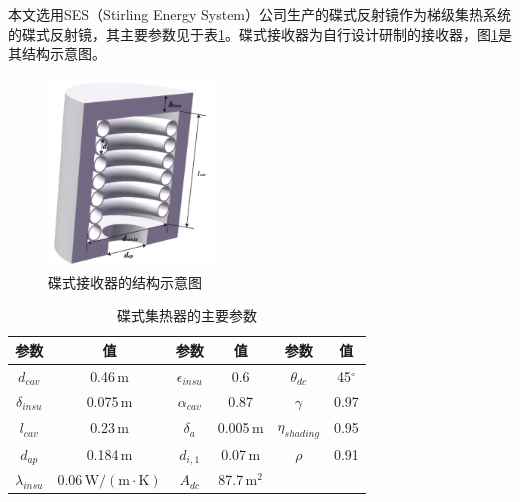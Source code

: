 本文选用SES（Stirling Energy System）公司生产的碟式反射镜作为梯级集热系统的碟式反射镜，其主要参数见于表\ref{tab:dc}。碟式接收器为自行设计研制的接收器，图\ref{fig:dishReceiver}是其结构示意图。

\begin{figure}[!ht]
\centering
\includegraphics[width=0.4\textwidth]{fig/DishReceiver.pdf}
\caption{碟式接收器的结构示意图}\label{fig:dishReceiver}
\end{figure}

\begin{table}[htbp]
	\setlength{\abovecaptionskip}{-10pt}
	\caption{碟式集热器的主要参数}
	\begin{center}
	\begin{tabular}{cccccc}
		\toprule
		参数		&	值	&	参数		&	值	&	参数		&	值\\
		\midrule
		$d_{cav}$	&	0.46$\,\mathrm{m}$	&	$\epsilon_{insu}$	&	0.6	&	$\theta_{dc}$	&	45$^\circ$\\
		$\delta_{insu}$	&	0.075$\,\mathrm{m}$	&	$\alpha_{cav}$	&	0.87	&	$\gamma$	&	0.97\\
		$l_{cav}$	&	0.23$\,\mathrm{m}$	&	$\delta_a$		&	0.005$\,\mathrm{m}$	&	$\eta_{shading}$	&	0.95\\
		$d_{ap}$	&	0.184$\,\mathrm{m}$	&	$d_{i,1}$	&	0.07$\,\mathrm{m}$	&	$\rho$	&	0.91\\
		$\lambda_{insu}$	&	0.06$\,\mathrm{W/(m\cdot K)}$	&	$A_{dc}$	&	87.7$\,\mathrm{m^2}$	&	\\		
		\bottomrule
	\end{tabular}
	\end{center}
	\label{tab:dc}
\end{table}


